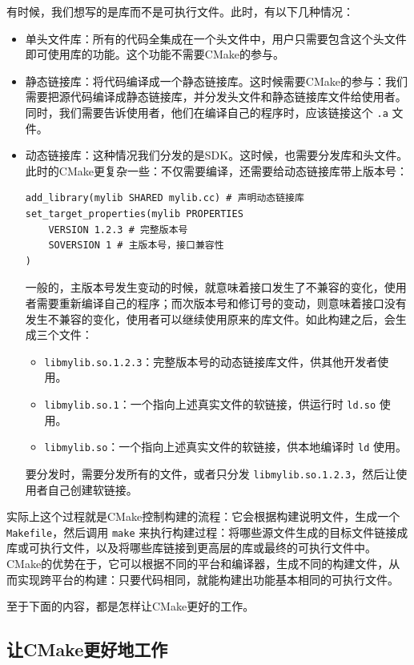 有时候，我们想写的是库而不是可执行文件。此时，有以下几种情况：
\begin{itemize}
    \item 单头文件库：所有的代码全集成在一个头文件中，用户只需要包含这个头文件即可使用库的功能。这个功能不需要CMake的参与。
    \item 静态链接库：将代码编译成一个静态链接库。这时候需要CMake的参与：我们需要把源代码编译成静态链接库，并分发头文件和静态链接库文件给使用者。同时，我们需要告诉使用者，他们在编译自己的程序时，应该链接这个 \verb|.a| 文件。
    \item 动态链接库：这种情况我们分发的是SDK。这时候，也需要分发库和头文件。此时的CMake更复杂一些：不仅需要编译，还需要给动态链接库带上版本号：
    \begin{verbatim}
add_library(mylib SHARED mylib.cc) # 声明动态链接库
set_target_properties(mylib PROPERTIES
    VERSION 1.2.3 # 完整版本号
    SOVERSION 1 # 主版本号，接口兼容性
)
    \end{verbatim}
    一般的，主版本号发生变动的时候，就意味着接口发生了不兼容的变化，使用者需要重新编译自己的程序；而次版本号和修订号的变动，则意味着接口没有发生不兼容的变化，使用者可以继续使用原来的库文件。如此构建之后，会生成三个文件：
    \begin{itemize}
        \item \verb|libmylib.so.1.2.3|：完整版本号的动态链接库文件，供其他开发者使用。
        \item \verb|libmylib.so.1|：一个指向上述真实文件的软链接，供运行时 \verb|ld.so| 使用。
        \item \verb|libmylib.so|：一个指向上述真实文件的软链接，供本地编译时 \verb|ld| 使用。
    \end{itemize}
    要分发时，需要分发所有的文件，或者只分发 \verb|libmylib.so.1.2.3|，然后让使用者自己创建软链接。
\end{itemize}

实际上这个过程就是CMake控制构建的流程：它会根据构建说明文件，生成一个 \verb|Makefile|，然后调用 \verb|make| 来执行构建过程：将哪些源文件生成的目标文件链接成库或可执行文件，以及将哪些库链接到更高层的库或最终的可执行文件中。CMake的优势在于，它可以根据不同的平台和编译器，生成不同的构建文件，从而实现跨平台的构建：只要代码相同，就能构建出功能基本相同的可执行文件。

至于下面的内容，都是怎样让CMake更好的工作。

\subsection{让CMake更好地工作}

